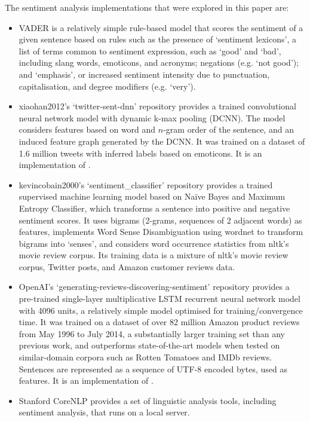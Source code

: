 \documentclass{report}
\begin{document}
The sentiment analysis implementations that were explored in this paper are:
\begin{itemize}
	\item VADER \cite{VADER} is a relatively simple rule-based model that scores the sentiment of a given sentence based on rules such as the presence of `sentiment lexicons', a list of terms common to sentiment expression, such as `good' and `bad', including slang words, emoticons, and acronyms; negations (e.g. `not good'); and `emphasis', or increased sentiment intensity due to punctuation, capitalisation, and degree modifiers (e.g. `very').
	\item xiaohan2012's `twitter-sent-dnn' repository provides a trained convolutional neural network model with dynamic k-max pooling (DCNN).
		The model considers features based on word and $n$-gram order of the sentence, and an induced feature graph generated by the DCNN.
		It was trained on a dataset of 1.6 million tweets with inferred labels based on emoticons.
		It is an implementation of \cite{kalchbrennerACL2014}.
	\item kevincobain2000's `sentiment\_classifier' repository \cite{kevincobain} provides a trained supervised machine learning model based on Na\"{i}ve Bayes and Maximum Entropy Classifier, which transforms a sentence into positive and negative sentiment scores.
		It uses bigrams (2-grams, sequences of 2 adjacent words) as features, implements Word Sense Disambiguation using wordnet \cite{banerjee2002adapted} to transform bigrams into `senses', and considers word occurrence statistics from nltk's movie review corpus.
		Its training data is a mixture of nltk's movie review corpus, Twitter posts, and Amazon customer reviews data. 
	\item OpenAI's `generating-reviews-discovering-sentiment' repository provides a pre-trained single-layer multiplicative LSTM recurrent neural network model with 4096 units, a relatively simple model optimised for training/convergence time.
		It was trained on a dataset of over 82 million Amazon product reviews from May 1996 to July 2014, a substantially larger training set than any previous work, and outperforms state-of-the-art models when tested on similar-domain corpora such as Rotten Tomatoes and IMDb reviews.
		Sentences are represented as a sequence of UTF-8 encoded bytes, used as features. 
		It is an implementation of \cite{OpenAI}.
	\item Stanford CoreNLP \cite{StanfordNLP} provides a set of linguistic analysis tools, including sentiment analysis, that runs on a local server.

\end{itemize}
\end{document}
